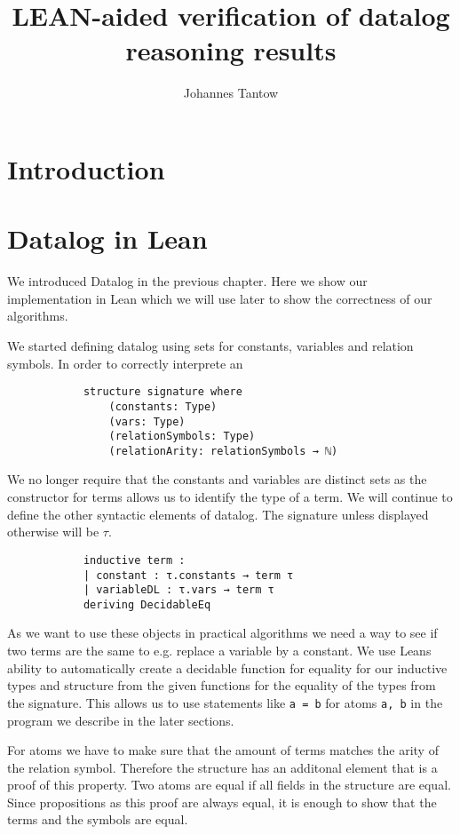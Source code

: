 \documentclass{article}
\title{LEAN-aided verification of datalog reasoning results}
\author{Johannes Tantow}
\begin{document}
    \maketitle
    \section{Introduction}
    
    \section{Datalog in Lean}
        
        We introduced Datalog in the previous chapter. Here we show our implementation in Lean which we will use later to show the correctness of our algorithms.

        We started defining datalog using sets for constants, variables and relation symbols. In order to correctly interprete an 

        \begin{lstlisting}
            structure signature where
                (constants: Type)
                (vars: Type)
                (relationSymbols: Type)
                (relationArity: relationSymbols → ℕ)
        \end{lstlisting}

        We no longer require that the constants and variables are distinct sets as the constructor for terms allows us to identify the type of a term. We will continue to define the other syntactic elements of datalog. The signature unless displayed otherwise will be $\tau$.

        \begin{lstlisting}
            inductive term :
            | constant : τ.constants → term τ
            | variableDL : τ.vars → term τ
            deriving DecidableEq
        \end{lstlisting}

        As we want to use these objects in practical algorithms we need a way to see if two terms are the same to e.g. replace a variable by a constant. We use Leans ability to automatically create a decidable function for equality for our inductive types and structure from the given functions for the equality of the types from the signature. This allows us to use statements like \texttt{a = b} for atoms \texttt{a, b} in the program we describe in the later sections.
    
        For atoms we have to make sure that the amount of terms matches the arity of the relation symbol. Therefore the structure has an additonal element that is a proof of this property. Two atoms are equal if all fields in the structure are equal. Since propositions as this proof are always equal, it is enough to show that the terms and the symbols are equal.
\end{document}
